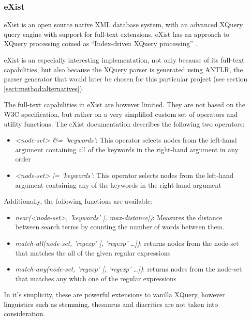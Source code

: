 \subsubsection{eXist}
\label{sect:stateOfTheArt:eXist}
eXist is an open source native XML database system, with an advanced XQuery
query engine with support for full-text extensions. eXist has an approach to
XQuery processing coined as ``Index-driven XQuery processing''
\cite{exist_idx_drv_query}.

eXist is an especially interesting implementation, not only because of its
full-text capabilities, but also because the XQuery parser is generated using
ANTLR, the parser generator that would later be chosen for this particular
project (see section \ref{sect:method:alternatives}).

The full-text capabilities in eXist are however limited. They are not based on
the W3C specification, but rather on a very simplified custom set of operators
and utility functions. The eXist documentation\cite{exist_doc} describes the
following two operators:

\begin{itemize}
  \item \emph{<node-set> \&= 'keywords'}: This operator selects nodes from the
  left-hand argument containing all of the keywords in the right-hand argument 
  in any order
  \item \emph{<node-set> |= 'keywords'}: This operator selects nodes from the
  left-hand argument containing any of the keywords in the right-hand argument
\end{itemize}

Additionally, the following functions are available:
\begin{itemize}
  \item \emph{near(<node-set>, 'keywords' [, max-distance])}: Measures the 
  distance between search terms by counting the number of words between 
  them.
  \item \emph{match-all(node-set, 'regexp' [, 'regexp' \ldots])}: returns
  nodes from the node-set that matches the all of the given regular expressions 
  \item \emph{match-any(node-set, 'regexp' [, 'regexp' \ldots])}: returns nodes
  from the node-set that matches any which one of the regular expressions
\end{itemize}

In it's simplicity, these are powerful extensions to vanilla XQuery, however
linguistics such as stemming, thesaurus and diacritics are not taken into
consideration.

